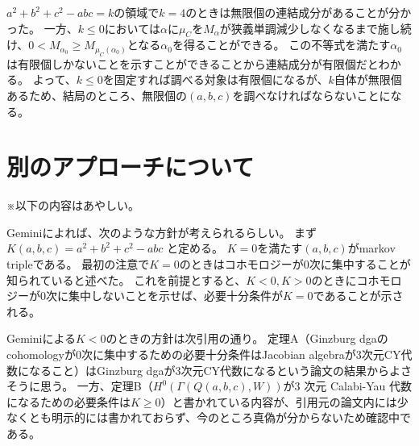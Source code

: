 \documentclass[uplatex,12pt,dvipdfmx]{jsarticle}
\theoremstyle{definition}
\numberwithin{equation}{section}
\begin{document}
$a^2+b^2+c^2-abc=k$の領域で$k=4$のときは無限個の連結成分があることが分かった。
一方、$k\le0$においては$\alpha$に$\mu_C$を$M_\alpha$が狭義単調減少しなくなるまで施し続け、$0<M_{\alpha_0}\geq M_{\mu_C(\alpha_0)}$となる$\alpha_0$を得ることができる。
この不等式を満たす$\alpha_0$は有限個しかないことを示すことができることから連結成分が有限個だとわかる。
よって、$k\le0$を固定すれば調べる対象は有限個になるが、$k$自体が無限個あるため、結局のところ、無限個の$(a,b,c)$を調べなければならないことになる。


\section{別のアプローチについて}

※以下の内容はあやしい。

Geminiによれば、次のような方針が考えられるらしい。
まず $K(a,b,c) = a^2 + b^2 + c^2 - abc$ と定める。
$K=0$を満たす$(a,b,c)$がmarkov tripleである。
最初の注意で$K=0$のときはコホモロジーが0次に集中することが知られていると述べた。
これを前提とすると、$K<0,K>0$のときにコホモロジーが0次に集中しないことを示せば、必要十分条件が$K=0$であることが示される。

Geminiによる$K<0$のときの方針は次引用の通り。
定理A（Ginzburg dgaのcohomologyが0次に集中するための必要十分条件はJacobian algebraが3次元CY代数になること）はGinzburg dgaが3次元CY代数になるという論文の結果からよさそうに思う。
一方、定理B（$H^0(\Gamma(Q(a,b,c),W))$が3 次元 Calabi-Yau 代数になるための必要条件は$K\ge0$）と書かれている内容が、引用元の論文内には少なくとも明示的には書かれておらず、今のところ真偽が分からないため確認中である。
\end{document}

